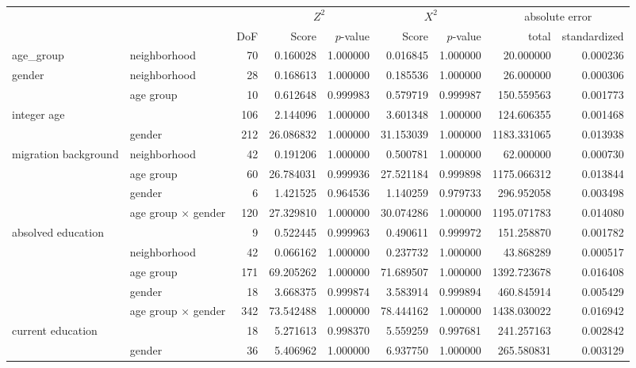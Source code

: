 \begin{tabular}{ll|r|rr|rr|rr}
\toprule
 &  &  & \multicolumn{2}{|c}{$Z^2$} & \multicolumn{2}{|c}{$X^2$} & \multicolumn{2}{|c}{absolute error} \\
 &  & DoF & Score & $p$-value & Score & $p$-value & total & standardized \\
\midrule
age_group & neighborhood & 70 & 0.160028 & 1.000000 & 0.016845 & 1.000000 & 20.000000 & 0.000236 \\
\cline{1-9}
\multirow[t]{2}{*}{gender} & neighborhood & 28 & 0.168613 & 1.000000 & 0.185536 & 1.000000 & 26.000000 & 0.000306 \\
 & age group & 10 & 0.612648 & 0.999983 & 0.579719 & 0.999987 & 150.559563 & 0.001773 \\
\cline{1-9}
\multirow[t]{2}{*}{integer age} &  & 106 & 2.144096 & 1.000000 & 3.601348 & 1.000000 & 124.606355 & 0.001468 \\
 & gender & 212 & 26.086832 & 1.000000 & 31.153039 & 1.000000 & 1183.331065 & 0.013938 \\
\cline{1-9}
\multirow[t]{4}{*}{migration background} & neighborhood & 42 & 0.191206 & 1.000000 & 0.500781 & 1.000000 & 62.000000 & 0.000730 \\
 & age group & 60 & 26.784031 & 0.999936 & 27.521184 & 0.999898 & 1175.066312 & 0.013844 \\
 & gender & 6 & 1.421525 & 0.964536 & 1.140259 & 0.979733 & 296.952058 & 0.003498 \\
 & age group $\times$ gender & 120 & 27.329810 & 1.000000 & 30.074286 & 1.000000 & 1195.071783 & 0.014080 \\
\cline{1-9}
\multirow[t]{5}{*}{absolved education} &  & 9 & 0.522445 & 0.999963 & 0.490611 & 0.999972 & 151.258870 & 0.001782 \\
 & neighborhood & 42 & 0.066162 & 1.000000 & 0.237732 & 1.000000 & 43.868289 & 0.000517 \\
 & age group & 171 & 69.205262 & 1.000000 & 71.689507 & 1.000000 & 1392.723678 & 0.016408 \\
 & gender & 18 & 3.668375 & 0.999874 & 3.583914 & 0.999894 & 460.845914 & 0.005429 \\
 & age group $\times$ gender & 342 & 73.542488 & 1.000000 & 78.444162 & 1.000000 & 1438.030022 & 0.016942 \\
\cline{1-9}
\multirow[t]{16}{*}{current education} &  & 18 & 5.271613 & 0.998370 & 5.559259 & 0.997681 & 241.257163 & 0.002842 \\
 & gender & 36 & 5.406962 & 1.000000 & 6.937750 & 1.000000 & 265.580831 & 0.003129 \\

\end{tabular}
